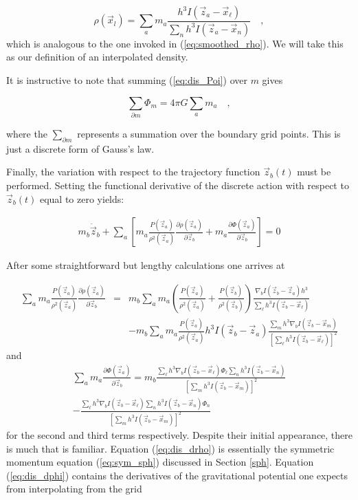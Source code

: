 \documentclass{article}
\def\x{{\vec x}}
\def\z{{\vec z}}
\def\P{{\Phi}}
\def\l{{\ell}}
\def\Pl{{\Phi_{\ell}}}
\def\_,{{\quad ,}}
\begin{document}
\begin{equation}\label{eq:dis_den}
   \rho(\x_l) = \sum_{a} m_a \frac{ h^3 I(\z_a - \x_\l)}{\sum_n h^3 I(\z_a -\x_n)} \_,
\end{equation}
which is analogous to the one invoked in (\ref{eq:smoothed_rho}).  We will take
this as our definition of an interpolated density.

It is instructive to note that summing (\ref{eq:dis_Poi}) over $m$ gives

\begin{equation}
  \sum_{\partial m} \P_m = 4 \pi G \sum_{a} m_{a} \_,
\end{equation}

where the $\sum_{\partial m}$ represents a summation over the boundary grid
points.  This is just a discrete form of Gauss's law.

Finally, the variation with respect to the trajectory function $\z_b(t)$ must
be performed.  Setting the functional derivative of the discrete action with
respect to $\z_b(t)$ equal to zero yields:

\begin{eqnarray}\label{eq:dis_particle}
  m_b {\ddot \z}_b + \sum_a \left[ m_a \frac{P(\z_a)}{\rho^2(\z_a)}
                                       \frac{\partial \rho(\z_a)}{\partial \z_b}
                                 + m_a \frac{\partial \P(\z_a)}{\partial \z_b}
                            \right] = 0
\end{eqnarray}

After some straightforward but lengthy calculations one arrives at

\begin{eqnarray}\label{eq:dis_drho}
  \sum_a m_a \frac{P(\z_a)}{\rho^2(\z_a)}
             \frac{\partial \rho(\z_a)}{\partial \z_b} & = &
    m_b \sum_a m_a
      \left(
        \frac{P(\z_a)}{\rho^2(\z_a)} + \frac{P(\z_b)}{\rho^2(\z_b)}
      \right)
      \frac{ \nabla_b I(\z_b - \z_a) h^3}{\sum_\l h^3 I(\z_b - \x_\l)}
    \nonumber \\
  & &   -
    m_b \sum_a m_a
      \frac{P(\z_a)}{\rho^2(\z_a)} h^3 I(\z_b - \z_a)
      \frac{\sum_m h^3 \nabla_b I(\z_b - \x_m)}
        {\left[ \sum_\l h^3 I( \z_b - \x_\l) \right] ^2}
\end{eqnarray}
%
and
%
\begin{eqnarray}\label{eq:dis_dphi}
  \sum_a m_a \frac{\partial \P(\z_a)}{\partial \z_b}
       = m_b \frac{ \sum_\l h^3 \nabla_b I (\z_b - \x_\l) \Pl
             \sum_n h^3 I(\z_b - \x_n)}{\left[
             \sum_m h^3 I( \z_b - \x_m) \right] ^2} \nonumber \\
           - \frac{\sum_\l h^3 \nabla_b I(\z_b - \x_\l)
             \sum_n h^3 I(\z_b - \x_n) \P_n}
            {\left[ \sum_m h^3 I( \z_b - \x_m) \right] ^2}
\end{eqnarray}
for the second and third terms respectively.  Despite their initial appearance,
there is much that is familiar.  Equation (\ref{eq:dis_drho}) is essentially
the symmetric momentum equation (\ref{eq:sym_sph}) discussed in Section
\ref{sph}.  Equation (\ref{eq:dis_dphi}) contains the derivatives of the
gravitational potential one expects from interpolating from the grid
\end{document}
